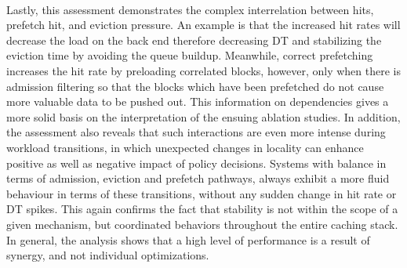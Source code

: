 \documentclass[sigconf]{acmart}
\begin{document}
{\\Lastly, this assessment demonstrates the complex interrelation between hits, prefetch hit, and eviction pressure. An example is that the increased hit rates will decrease the load on the back end therefore decreasing DT and stabilizing the eviction time by avoiding the queue buildup. Meanwhile, correct prefetching increases the hit rate by preloading correlated blocks, however, only when there is admission filtering so that the blocks which have been prefetched do not cause more valuable data to be pushed out. This information on dependencies gives a more solid basis on the interpretation of the ensuing ablation studies. In addition, the assessment also reveals that such interactions are even more intense during workload transitions, in which unexpected changes in locality can enhance positive as well as negative impact of policy decisions. Systems with balance in terms of admission, eviction and prefetch pathways, always exhibit a more fluid behaviour in terms of these transitions, without any sudden change in hit rate or DT spikes. This again confirms the fact that stability is not within the scope of a given mechanism, but coordinated behaviors throughout the entire caching stack. In general, the analysis shows that a high level of performance is a result of synergy, and not individual optimizations.

\clearpage
}
\end{document}

